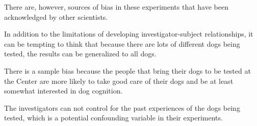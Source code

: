 \begin{inparaenum}[\bfseries 1]
\indent \item There are, however, sources of bias in these experiments that have been acknowledged by other scientists. \item In addition to the limitations of developing investigator-subject relationships, it can be tempting to think that because there are lots of different dogs being tested, the results can be generalized to all dogs. \item There is a sample bias because the people that bring their dogs to be tested at the Center are more likely to take good care of their dogs and be at least somewhat interested in dog cognition. \item The investigators can not control for the past experiences of the dogs being tested, which is a potential confounding variable in their experiments.
\end{inparaenum}

